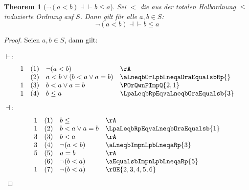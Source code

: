 \documentclass{book}
\theoremstyle{plain}
\newtheorem{theorem}{Theorem}
\theoremstyle{remark}
\theoremstyle{definition}
\begin{document}
\label{nLpaLneqbRpEqvbLeqa}
\begin{theorem}[\(\neg(a<b)\dashv\vdash b\leq a\)]
    Sei \(<\) die aus der totalen Halbordnung \(\leq\) induzierte Ordnung auf \(S\). Dann gilt für alle \(a,b\in S\):
    \[
    \neg(a<b)\dashv\vdash b\leq a
    \]
\end{theorem}
\begin{proof}
        Seien \(a,b\in S\), dann gilt:
        
\(\vdash\):
	\[
        \begin{array}{llll}
          1     &   (1)     &   \neg(a<b)                   & \rA                               \\
                &   (2)     &   a<b\lor (b<a\lor a=b)       & \aLneqbOrLpbLneqaOraEqualsbRp{}   \\
          1     &   (3)     &   b<a\lor a=b                 & \POrQwnPImpQ{2,1}                 \\
          1     &   (4)     &   b\leq a                     & \LpaLeqbRpEqvaLneqbOraEqualsb{3}  \\
        \end{array}
	\]
\(\dashv\):
 	\[
        \begin{array}{llll}
            1   &   (1) &   b\leq               &   \rA                                \\
            1   &   (2) &   b<a\lor a=b         &   \LpaLeqbRpEqvaLneqbOraEqualsb{1}   \\
            3   &   (3) &   b<a                 &   \rA                                \\
            3   &   (4) &   \neg(a<b)           &   \aLneqbImpnLpbLneqaRp{3}           \\
            5   &   (5) &   a=b                 &   \rA                                \\
                &   (6) &   \neg(b<a)           &   \aEqualsbImpnLpbLneqaRp{5}         \\
            1   &   (7) &   \neg(b<a)           & \rOE{2,3,4,5,6}                      \\
        \end{array}
	\]
\end{proof}
\end{document}

